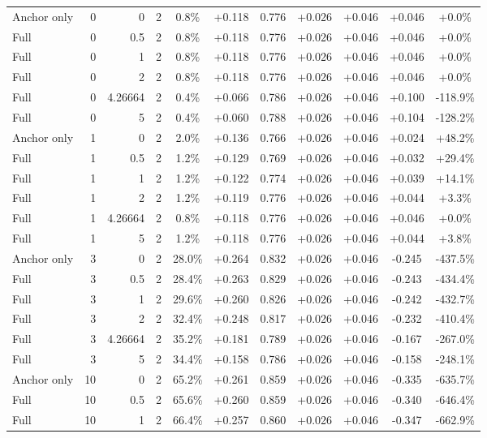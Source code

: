 \begin{table}[htbp]
\begin{tabular}{lrrrccccccc}
Anchor only & 0 & 0 & 2 & 0.8\% & +0.118 & 0.776 & +0.026 & +0.046 & +0.046 & +0.0\% \\
Full & 0 & 0.5 & 2 & 0.8\% & +0.118 & 0.776 & +0.026 & +0.046 & +0.046 & +0.0\% \\
Full & 0 & 1 & 2 & 0.8\% & +0.118 & 0.776 & +0.026 & +0.046 & +0.046 & +0.0\% \\
Full & 0 & 2 & 2 & 0.8\% & +0.118 & 0.776 & +0.026 & +0.046 & +0.046 & +0.0\% \\
Full & 0 & 4.26664 & 2 & 0.4\% & +0.066 & 0.786 & +0.026 & +0.046 & +0.100 & -118.9\% \\
Full & 0 & 5 & 2 & 0.4\% & +0.060 & 0.788 & +0.026 & +0.046 & +0.104 & -128.2\% \\
Anchor only & 1 & 0 & 2 & 2.0\% & +0.136 & 0.766 & +0.026 & +0.046 & +0.024 & +48.2\% \\
Full & 1 & 0.5 & 2 & 1.2\% & +0.129 & 0.769 & +0.026 & +0.046 & +0.032 & +29.4\% \\
Full & 1 & 1 & 2 & 1.2\% & +0.122 & 0.774 & +0.026 & +0.046 & +0.039 & +14.1\% \\
Full & 1 & 2 & 2 & 1.2\% & +0.119 & 0.776 & +0.026 & +0.046 & +0.044 & +3.3\% \\
Full & 1 & 4.26664 & 2 & 0.8\% & +0.118 & 0.776 & +0.026 & +0.046 & +0.046 & +0.0\% \\
Full & 1 & 5 & 2 & 1.2\% & +0.118 & 0.776 & +0.026 & +0.046 & +0.044 & +3.8\% \\
Anchor only & 3 & 0 & 2 & 28.0\% & +0.264 & 0.832 & +0.026 & +0.046 & -0.245 & -437.5\% \\
Full & 3 & 0.5 & 2 & 28.4\% & +0.263 & 0.829 & +0.026 & +0.046 & -0.243 & -434.4\% \\
Full & 3 & 1 & 2 & 29.6\% & +0.260 & 0.826 & +0.026 & +0.046 & -0.242 & -432.7\% \\
Full & 3 & 2 & 2 & 32.4\% & +0.248 & 0.817 & +0.026 & +0.046 & -0.232 & -410.4\% \\
Full & 3 & 4.26664 & 2 & 35.2\% & +0.181 & 0.789 & +0.026 & +0.046 & -0.167 & -267.0\% \\
Full & 3 & 5 & 2 & 34.4\% & +0.158 & 0.786 & +0.026 & +0.046 & -0.158 & -248.1\% \\
Anchor only & 10 & 0 & 2 & 65.2\% & +0.261 & 0.859 & +0.026 & +0.046 & -0.335 & -635.7\% \\
Full & 10 & 0.5 & 2 & 65.6\% & +0.260 & 0.859 & +0.026 & +0.046 & -0.340 & -646.4\% \\
Full & 10 & 1 & 2 & 66.4\% & +0.257 & 0.860 & +0.026 & +0.046 & -0.347 & -662.9\% \\

\end{tabular}
\end{table}
